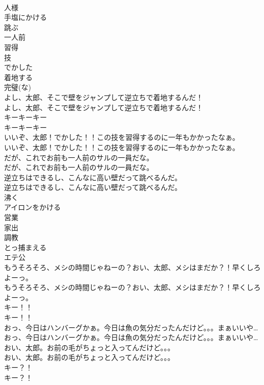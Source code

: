 \documentclass[8pt]{extreport}
\begin{document}
\begin{CJK}{UTF8}{min}
\\	人様
\\	手塩にかける
\\	跳ぶ
\\	一人前
\\	習得
\\	技
\\	でかした
\\	着地する
\\	完璧(な)
\\	よし、太郎、そこで壁をジャンプして逆立ちで着地するんだ！	
\\	よし、太郎、そこで壁をジャンプして逆立ちで着地するんだ！ 
\\	キーキーキー	
\\	キーキーキー 
\\	いいぞ、太郎！でかした！！この技を習得するのに一年もかかったなぁ。	
\\	いいぞ、太郎！でかした！！この技を習得するのに一年もかかったなぁ。 
\\	だが、これでお前も一人前のサルの一員だな。	
\\	だが、これでお前も一人前のサルの一員だな。 
\\	逆立ちはできるし、こんなに高い壁だって跳べるんだ。	
\\	逆立ちはできるし、こんなに高い壁だって跳べるんだ。 
\\	沸く
\\	アイロンをかける
\\	営業
\\	家出
\\	調教
\\	とっ捕まえる
\\	エテ公
\\	もうそろそろ、メシの時間じゃねーの？おい、太郎、メシはまだか？！早くしろよーっ。	
\\	もうそろそろ、メシの時間じゃねーの？おい、太郎、メシはまだか？！早くしろよーっ。 
\\	キー！！	
\\	キー！！ 
\\	おっ、今日はハンバーグかぁ。今日は魚の気分だったんだけど。。。まぁいいや…	
\\	おっ、今日はハンバーグかぁ。今日は魚の気分だったんだけど。。。まぁいいや… 
\\	おい、太郎。お前の毛がちょっと入ってんだけど。。。	
\\	おい、太郎。お前の毛がちょっと入ってんだけど。。。 
\\	キー？！	
\\	キー？！ 

\end{CJK}
\end{document}
